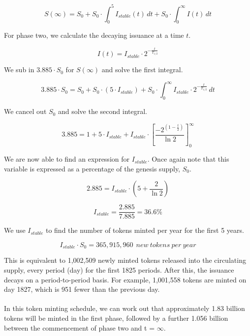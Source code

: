 \documentclass[8pt]{article}
\begin{document}
\begin{equation}
    S(\infty) = S_0  +  S_0 \cdot \int_0^{5} I_{stable}(t)\, dt  +  S_0 \cdot \int_0^{\infty} I(t)\, dt
\end{equation}

For phase two, we calculate the decaying issuance at a time $t$.
 
 \begin{equation}
    I(t) = I_{stable} \cdot 2^{-\frac{t}{T_{1/2}}}
\end{equation}

We sub in $3.885 \cdot S_0$ for $S(\infty)$ and solve the first integral.

\begin{equation}
    3.885 \cdot S_0  = S_0 + S_0 \cdot (5 \cdot I_{stable}) + S_0 \cdot \int_0^{\infty} I_{stable} \cdot 2^{-\frac{t}{T_{1/2}}} \, dt
\end{equation}

We cancel out $S_0$ and solve the second integral.

\begin{equation}
    3.885 = 1 + 5 \cdot  I_{stable} + I_{stable} \cdot \left[\frac{-2^{(1-\frac{t}{2})}}{\ln{2}}\right]_0^\infty
\end{equation}

We are now able to find an expression for $I_{stable}$. Once again note that this variable is expressed as a percentage of the genesis supply, $S_0$.

\begin{equation}
    2.885 = I_{stable} \cdot (5 + \frac{2}{\ln{2}})
\end{equation}

\begin{equation}
   I_{stable} = \frac{2.885}{7.885} = 36.6\%
\end{equation}

We use $I_{stable}$ to find the number of tokens minted per year for the first 5 years.

\begin{equation}
   I_{stable} \cdot S_0 = 365,915,960\:\:new \:tokens \:per \:year
\end{equation}

This is equivalent to 1,002,509 newly minted tokens released into the circulating supply, every period (day) for the first 1825 periods. After this, the issuance decays on a period-to-period basis. For example, 1,001,558 tokens are minted on day 1827, which is 951 fewer than the previous day.
\\\\
In this token minting schedule, we can work out that approximately 1.83 billion tokens will be minted in the first phase, followed by a further 1.056 billion between the commencement of phase two and t = $\infty$.
\end{document}
